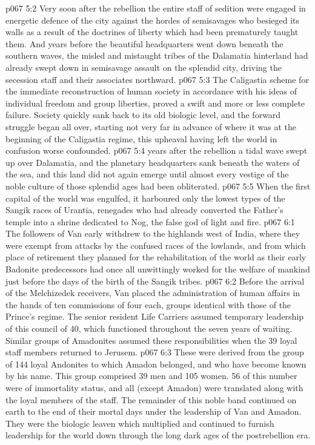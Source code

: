 \vs p067 5:2 Very soon after the rebellion the entire staff of sedition were engaged in energetic defence of the city against the hordes of semisavages who besieged its walls as a result of the doctrines of liberty which had been prematurely taught them. And years before the beautiful headquarters went down beneath the southern waves, the misled and mistaught tribes of the Dalamatia hinterland had already swept down in semisavage assault on the splendid city, driving the secession staff and their associates northward.
\vs p067 5:3 The Caligastia scheme for the immediate reconstruction of human society in accordance with his ideas of individual freedom and group liberties, proved a swift and more or less complete failure. Society quickly sank back to its old biologic level, and the forward struggle began all over, starting not very far in advance of where it was at the beginning of the Caligastia regime, this upheaval having left the world in confusion worse confounded.
\vs p067 5:4  years after the rebellion a tidal wave swept up over Dalamatia, and the planetary headquarters sank beneath the waters of the sea, and this land did not again emerge until almost every vestige of the noble culture of those splendid ages had been obliterated.
\vs p067 5:5 When the first capital of the world was engulfed, it harboured only the lowest types of the Sangik races of Urantia, renegades who had already converted the Father’s temple into a shrine dedicated to Nog, the false god of light and fire.
\vs p067 6:1 The followers of Van early withdrew to the highlands west of India, where they were exempt from attacks by the confused races of the lowlands, and from which place of retirement they planned for the rehabilitation of the world as their early Badonite predecessors had once all unwittingly worked for the welfare of mankind just before the days of the birth of the Sangik tribes.
\vs p067 6:2 Before the arrival of the Melchizedek receivers, Van placed the administration of human affairs in the hands of ten commissions of four each, groups identical with those of the Prince’s regime. The senior resident Life Carriers assumed temporary leadership of this council of 40, which functioned throughout the seven years of waiting. Similar groups of Amadonites assumed these responsibilities when the 39 loyal staff members returned to Jerusem.
\vs p067 6:3 These  were derived from the group of 144 loyal Andonites to which Amadon belonged, and who have become known by his name. This group comprised 39 men and 105 women. 56 of this number were of immortality status, and all (except Amadon) were translated along with the loyal members of the staff. The remainder of this noble band continued on earth to the end of their mortal days under the leadership of Van and Amadon. They were the biologic leaven which multiplied and continued to furnish leadership for the world down through the long dark ages of the postrebellion era.
